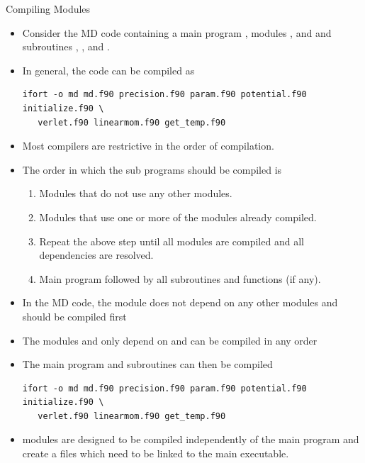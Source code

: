 \documentclass[10pt,t]{beamer}
\begin{document}
\begin{frame}{Compiling Modules}
  \begin{itemize}
    \item Consider the MD code containing a main program , modules ,  and  and subroutines , ,  and .
    \item In general, the code can be compiled as 
      \begin{Verbatim}[fontsize=\fontsize{6}{7}\selectfont,formatcom=\color{indigo}]
ifort -o md md.f90 precision.f90 param.f90 potential.f90 initialize.f90 \
   verlet.f90 linearmom.f90 get_temp.f90
      \end{Verbatim}
    \item Most compilers are restrictive in the order of compilation.
    \item The order in which the sub programs should be compiled is
    \begin{enumerate}
      \scriptsize
      \item Modules that do not use any other modules.
      \item Modules that use one or more of the modules already compiled.
      \item Repeat the above step until all modules are compiled and all dependencies are resolved.
      \item Main program followed by all subroutines and functions (if any).
    \end{enumerate}
    \item In the MD code, the module  does not depend on any other modules and should be compiled first
    \item The modules \Verblue{param} and \Verblue{potential} only depend on \Verblue{precision} and can be compiled in any order
    \item The main program and subroutines can then be compiled
      \begin{Verbatim}[fontsize=\fontsize{6}{7}\selectfont,formatcom=\color{indigo}]
ifort -o md md.f90 precision.f90 param.f90 potential.f90 initialize.f90 \
   verlet.f90 linearmom.f90 get_temp.f90
      \end{Verbatim}
    \item modules are designed to be compiled independently of the main program and create a  files which need to be linked to the main executable.

\end{itemize}
\end{frame}
\end{document}
